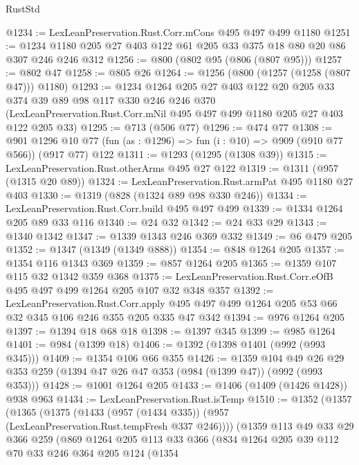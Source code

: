 \begin{lexlean}{RustStd}
\begin{coremodule}
@1234 := LexLeanPreservation.Rust.Corr.mCons @495 @497 @499 @1180
@1251 := @1234 @1180 @205 @27 @403 @122 @61 @205 @33 @375 @18 @80 @20 @86 @307 @246 @246 @312
@1256 := @800 (@802 @95 (@806 (@807 @95)))
@1257 := @802 @47
@1258 := @805 @26
@1264 := @1256 (@800 (@1257 (@1258 (@807 @47))) @1180)
@1293 := @1234
    @1264
    @205
    @27
    @403
    @122
    @20
    @205
    @33
    @374
    @39
    @89
    @98
    @117
    @330
    @246
    @246
    @370
    (LexLeanPreservation.Rust.Corr.mNil @495 @497 @499 @1180 @205 @27 @403 @122 @205 @33)
@1295 := @713 (@506 @77)
@1296 := @474 @77
@1308 := @901
    @1296
    @10
    @77
    (fun (as : @1296) => fun (i : @10) => @909 (@910 @77 @566))
    (@917 @77)
    @122
@1311 := @1293 (@1295 (@1308 @39))
@1315 := LexLeanPreservation.Rust.otherArms @495 @27 @122
@1319 := @1311 (@957 (@1315 @20 @89))
@1324 := LexLeanPreservation.Rust.armPat @495 @1180 @27 @403
@1330 := @1319 (@828 (@1324 @89 @98 @330 @246))
@1334 := LexLeanPreservation.Rust.Corr.build @495 @497 @499
@1339 := @1334 @1264 @205 @89 @33 @116
@1340 := @24 @32
@1342 := @24 @33 @29
@1343 := @1340 @1342
@1347 := @1339 @1343 @246 @369 @332
@1349 := @6 @479 @205
@1352 := @1347 (@1349 (@1349 @888))
@1354 := @848 @1264 @205
@1357 := @1354 @116 @1343 @369
@1359 := @857 @1264 @205
@1365 := @1359 @107 @115 @32 @1342 @359 @368
@1375 := LexLeanPreservation.Rust.Corr.eOfB @495 @497 @499 @1264 @205 @107 @32 @348 @357
@1392 := LexLeanPreservation.Rust.Corr.apply
    @495
    @497
    @499
    @1264
    @205
    @53
    @66
    @32
    @345
    @106
    @246
    @355
    @205
    @335
    @47
    @342
@1394 := @976 @1264 @205
@1397 := @1394 @18 @68 @18
@1398 := @1397 @345
@1399 := @985 @1264
@1401 := @984 (@1399 @18)
@1406 := @1392 (@1398 @1401 (@992 (@993 @345)))
@1409 := @1354 @106 @66 @355
@1426 := @1359
    @104
    @49
    @26
    @29
    @353
    @259
    (@1394 @47 @26 @47 @353 (@984 (@1399 @47)) (@992 (@993 @353)))
@1428 := @1001 @1264 @205
@1433 := @1406 (@1409 (@1426 @1428)) @938 @963
@1434 := LexLeanPreservation.Rust.isTemp
@1510 := @1352
    (@1357
      (@1365
        (@1375 (@1433 (@957 (@1434 @335)) (@957 (LexLeanPreservation.Rust.tempFresh @337 @246))))
        (@1359
          @113
          @49
          @33
          @29
          @366
          @259
          (@869
            @1264
            @205
            @113
            @33
            @366
            (@834
              @1264
              @205
              @39
              @112
              @70
              @33
              @246
              @364
              @205
              @124
              (@1354

\end{coremodule}
\end{lexlean}
